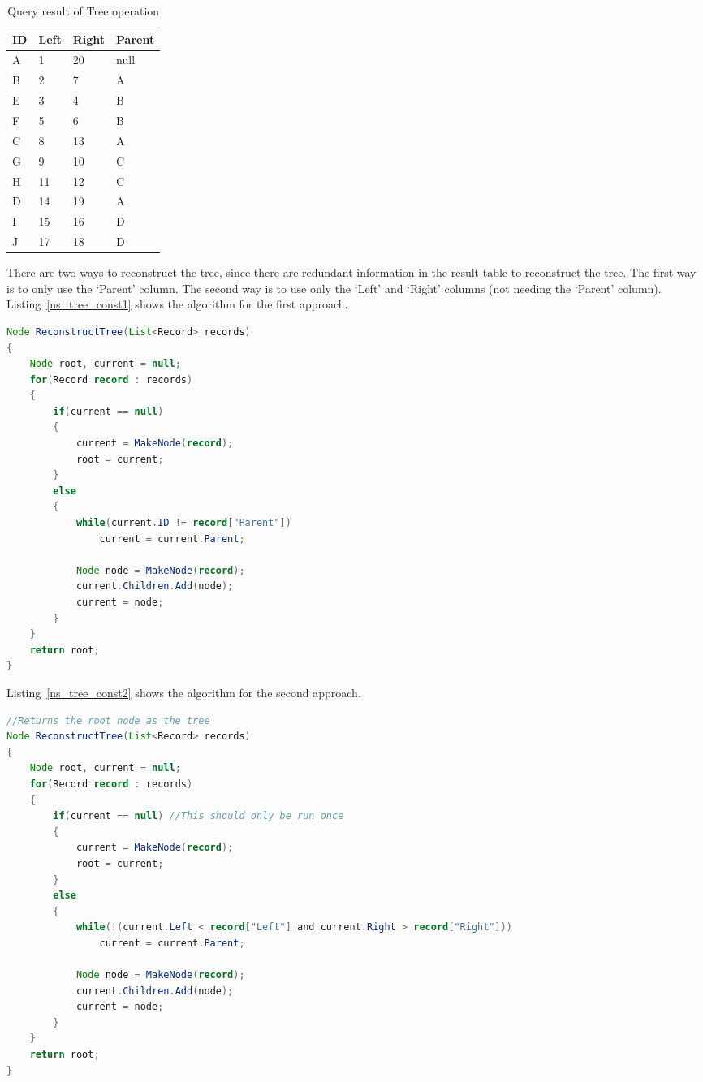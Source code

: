 \begin{table}[h]
\centering
\begin{tabular}{|l|l|l|l|}
\hline
{\bf ID} & {\bf Left} & {\bf Right} & {\bf Parent} \\ \hline\hline
A & 1 & 20 & null \\ \hline
B & 2 & 7 & A \\ \hline
E & 3 & 4 & B \\ \hline
F & 5 & 6 & B \\ \hline
C & 8 & 13 & A \\ \hline
G & 9 & 10 & C \\ \hline
H & 11 & 12	& C \\ \hline
D & 14 & 19	& A \\ \hline
I & 15 & 16	& D \\ \hline
J & 17 & 18	& D \\ \hline
\end{tabular}
\caption{Query result of Tree operation\label{table:ns_tree}}
\end{table}

There are two ways to reconstruct the tree, since there are redundant information in the result table to reconstruct the tree. The first way is to only use the `Parent' column. The second way is to use only the `Left' and `Right' columns (not needing the `Parent' column). Listing~\ref{ns_tree_const1} shows the algorithm for the first approach.

\begin{lstlisting}[language=java,style=java,caption={Tree reconstruction using Parent},label=ns_tree_const1]
Node ReconstructTree(List<Record> records)
{
    Node root, current = null;
    for(Record record : records)
    {
        if(current == null)
        {
            current = MakeNode(record);
            root = current;
        }
        else
        {
            while(current.ID != record["Parent"])
                current = current.Parent;

            Node node = MakeNode(record);
            current.Children.Add(node);
            current = node;
        }
    }
	return root;
}
\end{lstlisting}

Listing~\ref{ns_tree_const2} shows the algorithm for the second approach.

\begin{lstlisting}[language=java,style=java,caption={Tree reconstruction using Left and Right value},label=ns_tree_const2]
//Returns the root node as the tree
Node ReconstructTree(List<Record> records)
{
    Node root, current = null;
    for(Record record : records)
    {
        if(current == null) //This should only be run once
        {
            current = MakeNode(record);
            root = current;
        }        
        else
		{
            while(!(current.Left < record["Left"] and current.Right > record["Right"]))
                current = current.Parent;
                
            Node node = MakeNode(record);
            current.Children.Add(node);
            current = node;
        }
    }
    return root;
}
\end{lstlisting}	

